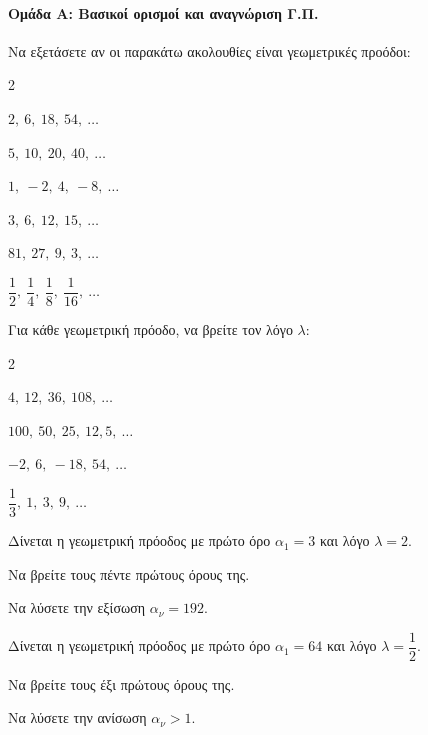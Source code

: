 \documentclass[11pt,a4paper,modern]{FFExercises}
\begin{document}


\paragraph{Ομάδα Α: Βασικοί ορισμοί και αναγνώριση Γ.Π.}

\askhsh
Να εξετάσετε αν οι παρακάτω ακολουθίες είναι γεωμετρικές προόδοι:
\begin{multicols}{2}
\begin{alist}
  \item $2,\ 6,\ 18,\ 54,\ \ldots$
  \item $5,\ 10,\ 20,\ 40,\ \ldots$
  \item $1,\ -2,\ 4,\ -8,\ \ldots$
  \item $3,\ 6,\ 12,\ 15,\ \ldots$
  \item $81,\ 27,\ 9,\ 3,\ \ldots$
  \item $\dfrac{1}{2},\ \dfrac{1}{4},\ \dfrac{1}{8},\ \dfrac{1}{16},\ \ldots$
\end{alist}
\end{multicols}

\askhsh
Για κάθε γεωμετρική πρόοδο, να βρείτε τον λόγο $\lambda$:
\begin{multicols}{2}
\begin{alist}
  \item $4,\ 12,\ 36,\ 108,\ \ldots$
  \item $100,\ 50,\ 25,\ 12{,}5,\ \ldots$
  \item $-2,\ 6,\ -18,\ 54,\ \ldots$
  \item $\dfrac{1}{3},\ 1,\ 3,\ 9,\ \ldots$
\end{alist}
\end{multicols}

\askhsh
Δίνεται η γεωμετρική πρόοδος με πρώτο όρο $\alpha_1 = 3$ και λόγο $\lambda = 2$.
\begin{alist}
  \item Να βρείτε τους πέντε πρώτους όρους της.
  \item Να λύσετε την εξίσωση $\alpha_\nu = 192$.
\end{alist}

\askhsh
Δίνεται η γεωμετρική πρόοδος με πρώτο όρο $\alpha_1 = 64$ και λόγο $\lambda = \dfrac{1}{2}$.
\begin{alist}
  \item Να βρείτε τους έξι πρώτους όρους της.
  \item Να λύσετε την ανίσωση $\alpha_\nu > 1$.
\end{alist}
\end{document}
